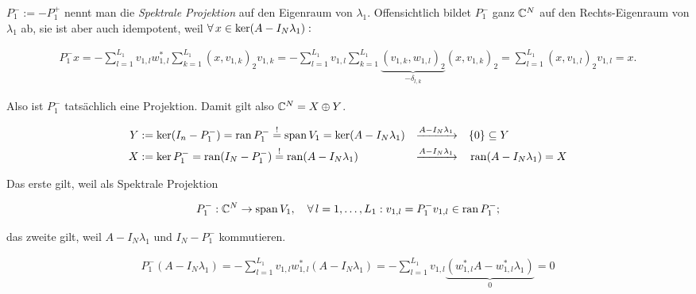 \begin{remark} \label{spektrale_projektion}
    
    $P_1^- := -P_1^+$ nennt man die \textit{Spektrale Projektion} auf den Eigenraum von $\lambda_1$.
    Offensichtlich bildet $P_1^-$ ganz $\mathbb{C}^N$ auf den Rechts-Eigenraum von $\lambda_1$ ab, sie ist aber auch idempotent, weil $\forall \, x \in \ker(A - I_N \lambda_1):$

    \begin{align*}
        P_1^- x
        =
        -\sum_{l=1}^{L_1}
            v_{1, l}
            w_{1, l}^\ast
            \sum_{k=1}^{L_1}
                (x, v_{1, k})_2
                v_{1, k}
        =
        -\sum_{l=1}^{L_1}
            v_{1, l}
            \sum_{k=1}^{L_1}
                \underbrace{(v_{1, k}, w_{1, l})_2}_{-\delta_{l, k}}
                (x, v_{1, k})_2
        =
        \sum_{l=1}^{L_1}
            (x, v_{1, l})_2
            v_{1, l}
        =
        x.
    \end{align*}

    Also ist $P_1^-$ tatsächlich eine Projektion.
    Damit gilt also $ \mathbb{C}^N = X \oplus Y$.

    \begin{align*}
        Y & := \ker (I_n - P_1^-) = \operatorname{ran} P_1^- \stackrel{!}{=} \operatorname{span} V_1 = \ker(A - I_N \lambda_1) & \xrightarrow{A - I_N \lambda_1} \quad & {\left \{ 0 \right \}} \subseteq Y \\
        X & := \ker P_1^- = \operatorname{ran}(I_N - P_1^-) \stackrel{!}{=} \operatorname{ran}(A - I_N \lambda_1)              & \xrightarrow{A - I_N \lambda_1} \quad & \operatorname{ran}(A - I_N \lambda_1) = X
    \end{align*}

    Das erste \Quote{!} gilt, weil als Spektrale Projektion

    \begin{align*}
        P_1^-: \mathbb{C}^N \to \operatorname{span} V_1,
        \quad
        \forall \, l = 1, \dots, L_1:
            v_{1, l} = P_1^- v_{1, l} \in \operatorname{ran} P_1^-;
    \end{align*}

    das zweite \Quote{!} gilt, weil $A - I_N \lambda_1$ und $I_N - P_1^-$ kommutieren.

    \begin{align*}
        P_1^- (A - I_N \lambda_1)
        =
        -\sum_{l=1}^{L_1}
            v_{1, l} w_{1, l}^\ast
        (A - I_N \lambda_1)
        =
        -\sum_{l=1}^{L_1}
            v_{1, l}
            \underbrace
            {
                (w_{1, l}^\ast A
                -
                w_{1, l}^\ast \lambda_1)
            }_0
        =
        0
    \end{align*}


\end{remark}
